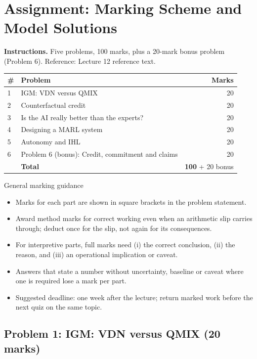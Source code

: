 \documentclass[11pt]{article}
\begin{document}
\section{Assignment: Marking Scheme and Model Solutions}

\textbf{Instructions.} Five problems, 100 marks, plus a 20-mark bonus problem (Problem 6). Reference: Lecture 12 reference text.

\begin{center}\small\renewcommand{\arraystretch}{1.25}\begin{tabularx}{0.85\textwidth}{@{}l X r@{}}\toprule\textbf{\#} & \textbf{Problem} & \textbf{Marks}\\\midrule1 & IGM: VDN versus QMIX & 20\\
2 & Counterfactual credit & 20\\
3 & Is the AI really better than the experts? & 20\\
4 & Designing a MARL system & 20\\
5 & Autonomy and IHL & 20\\
6 & Problem 6 (bonus): Credit, commitment and claims & 20\\\midrule & \textbf{Total} & \textbf{100} + 20 bonus\\\bottomrule\end{tabularx}\end{center}

\begin{instr}{General marking guidance}\begin{itemize}
\item Marks for each part are shown in square brackets in the problem statement.
\item Award method marks for correct working even when an arithmetic slip carries through; deduct once for the slip, not again for its consequences.
\item For interpretive parts, full marks need (i) the correct conclusion, (ii) the reason, and (iii) an operational implication or caveat.
\item Answers that state a number without uncertainty, baseline or caveat where one is required lose a mark per part.
\item Suggested deadline: one week after the lecture; return marked work before the next quiz on the same topic.
\end{itemize}\end{instr}

\subsection{Problem 1: IGM: VDN versus QMIX \normalfont\small\color{GreyN}(20 marks)}
\end{document}
